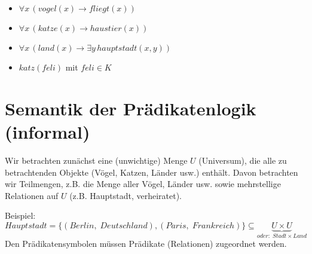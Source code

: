 \begin{itemize}
\item $\forall x\, (vogel(x) \to fliegt(x))$\\
\item $\forall x\, (katze(x) \to haustier(x))$
\item $\forall x\, (land(x) \to \exists y\, hauptstadt (x,y))$\\
\item $katz(feli)$ mit $feli \in K$
\end{itemize}

\section{Semantik der Prädikatenlogik (informal)}
Wir betrachten zunächst eine (unwichtige) Menge $U$ (Universum), die alle zu betrachtenden Objekte (Vögel, Katzen, Länder usw.) enthält. Davon betrachten wir Teilmengen, z.B. die Menge aller Vögel, Länder usw. sowie mehrstellige Relationen auf $U$ (z.B. Hauptstadt, verheiratet).

Beispiel: $Hauptstadt=\{(Berlin,\;Deutschland), (Paris, \; Frankreich)\} \subseteq \underbrace{U \times U}_{oder:\; Stadt\times Land}$\\
Den Prädikatensymbolen müssen Prädikate (Relationen) zugeordnet werden.

